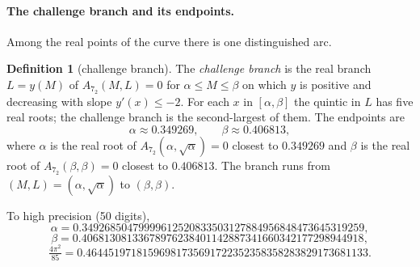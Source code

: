 \documentclass[11pt]{article}
\theoremstyle{definition}
\newtheorem{definition}{Definition}
\begin{document}
\paragraph{The challenge branch and its endpoints.}
Among the real points of the curve there is one distinguished arc.

\begin{definition}[challenge branch]\label{def:branch}
The \emph{challenge branch} is the real branch $L=y(M)$ of $A_{7_2}(M,L)=0$ for
$\alpha\le M\le\beta$ on which $y$ is positive and decreasing with slope
$y'(x)\le-2$.  For each $x$ in $[\alpha,\beta]$ the quintic in $L$ has five real
roots; the challenge branch is the second-largest of them.  The endpoints are
\[
 \alpha\approx 0.349269,\qquad \beta\approx 0.406813,
\]
where $\alpha$ is the real root of $A_{7_2}(\alpha,\sqrt\alpha)=0$ closest to
$0.349269$ and $\beta$ is the real root of $A_{7_2}(\beta,\beta)=0$ closest to
$0.406813$.  The branch runs from $(M,L)=(\alpha,\sqrt\alpha)$ to $(\beta,\beta)$.
\end{definition}

\noindent To high precision (50 digits),
\[
 \alpha = 0.34926850479999612520833503127884956848473645319259,
\]
\[
 \beta  = 0.40681308133678976238401142887341660342177298944918,
\]
\[
 \tfrac{4\pi^2}{85} = 0.46445197181596981735691722352358358283829173681133.
\]
\end{document}
